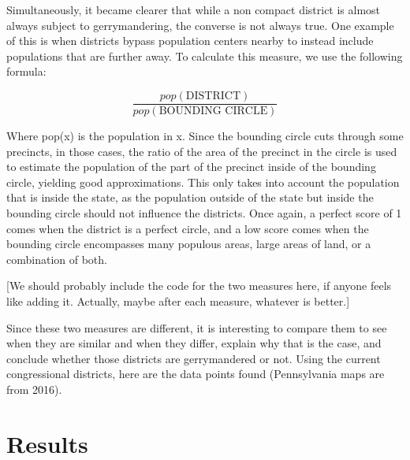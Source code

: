 \documentclass[letterpaper]{article}
\begin{document}
Simultaneously, it became clearer that while a non compact district is almost always subject to gerrymandering, the converse is not always true. One example of this is when districts bypass population centers nearby to instead include populations that are further away. 
To calculate this measure, we use the following formula:

\[
	\frac{pop(\text{DISTRICT})}{pop(\text{BOUNDING CIRCLE})}
\]

Where pop(x) is the population in x. Since the bounding circle cuts through some precincts, in those cases, the ratio of the area of the precinct in the circle is used to estimate the population of the part of the precinct inside of the bounding circle, yielding good approximations. This only takes into account the population that is inside the state, as the population outside of the state but inside the bounding circle should not influence the districts. Once again, a perfect score of 1 comes when the district is a perfect circle, and a low score comes when the bounding circle encompasses many populous areas, large areas of land, or a combination of both.

[We should probably include the code for the two measures here, if anyone feels like adding it. Actually, maybe after each measure, whatever is better.]

Since these two measures are different, it is interesting to compare them to see when they are similar and when they differ, explain why that is the case, and conclude whether those districts are gerrymandered or not. Using the current congressional districts, here are the data points found (Pennsylvania maps are from 2016).

\section{Results}

\end{document}
